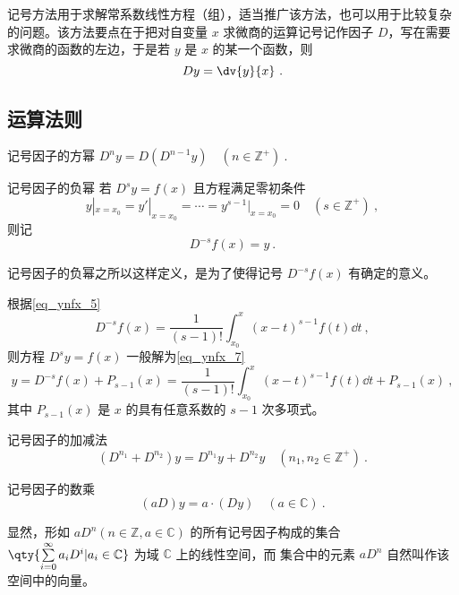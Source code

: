 
记号方法用于求解常系数线性方程（组），适当推广该方法，也可以用于比较复杂的问题。该方法要点在于把对自变量 $x$ 求微商的运算记号记作因子 $D$，写在需要求微商的函数的左边，于是若 $y$ 是 $x$ 的某一个函数，则
\begin{equation}\label{eq_Sign_10}
Dy=\dv{y}{x}~.
\end{equation}
\subsection{运算法则}
\begin{definition}{记号因子的方幂}\label{def_Sign_1}
$D^ny=D(D^{n-1}y)\quad(n\in\mathbb{Z^{+}})~.$
\end{definition}
\begin{definition}{记号因子的负幂}\label{def_Sign_2}
若 $D^sy=f(x)$ 且方程满足零初条件
\begin{equation}\label{eq_Sign_5}
y|_{x=x_0}=y'|_{x=x_0}=\cdots=y^{s-1}|_{x=x_0}=0\quad({s\in\mathbb{Z^{+}}})~,
\end{equation}
则记
\begin{equation}
D^{-s}f(x)=y~.
\end{equation}
\end{definition}
记号因子的负幂之所以这样定义，是为了使得记号 $D^{-s}f(x)$ 有确定的意义。

根据\autoref{eq_ynfx_5}~
\begin{equation}\label{eq_Sign_9}
D^{-s}f(x)=\frac{1}{(s-1)!}\int_{x_0}^x(x-t)^{s-1}f(t)\dd t~,
\end{equation}
则方程 $D^sy=f(x)$ 一般解为\autoref{eq_ynfx_7}~
\begin{equation}
y=D^{-s}f(x)+P_{s-1}(x)=\frac{1}{(s-1)!}\int_{x_0}^x(x-t)^{s-1}f(t)\dd t+P_{s-1}(x)~,
\end{equation}
其中 $P_{s-1}(x)$ 是 $x$ 的具有任意系数的 $s-1$ 次多项式。
\begin{definition}{记号因子的加减法}
\begin{equation}
(D^{n_1}+D^{n_2})y=D^{n_1}y+D^{n_2}y\quad(n_1,n_2\in \mathbb{Z^{+
}})~.
\end{equation}
\end{definition}
\begin{definition}{记号因子的数乘}
\begin{equation}
(aD)y=a\cdot(Dy)\quad(a\in\mathbb{C})~.
\end{equation}
\end{definition}
显然，形如 $aD^n(n\in \mathbb{Z},a\in\mathbb{C})$ 的所有记号因子构成的集合 $\qty{\sum\limits_{i=0}^\infty a_iD^i|a_i\in\mathbb{C}}$ 为域 $\mathbb C$ 上的线性空间，而 集合中的元素 $aD^n$ 自然叫作该空间中的向量。

